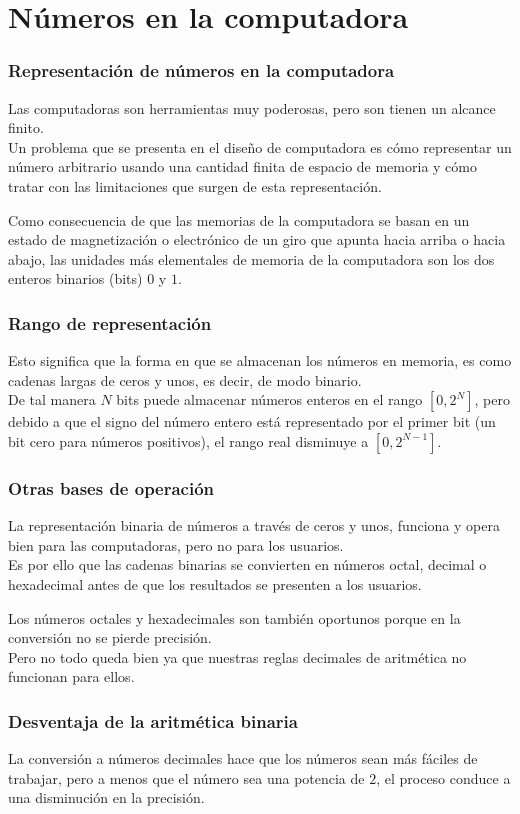 \section{Números en la computadora}
\begin{frame}
\frametitle{Representación de números en la computadora}
Las computadoras son herramientas muy poderosas, pero son tienen un alcance finito.
\\
\bigskip
Un problema que se presenta en el diseño de computadora es cómo representar un número arbitrario usando una cantidad finita de espacio de memoria y cómo tratar con las limitaciones que surgen de esta representación.
\end{frame}
\begin{frame}
Como consecuencia de que las memorias de la computadora se basan en un estado de magnetización o electrónico de un giro que apunta hacia arriba o hacia abajo, las unidades más elementales de memoria de la computadora son los dos enteros binarios (bits) $0$ y $1$.
\end{frame}
\begin{frame}
\frametitle{Rango de representación}
Esto significa que la forma en que se almacenan los números en memoria, es como cadenas largas de ceros y unos, es decir, de modo binario.
\\
\bigskip
De tal manera $N$ bits puede almacenar números enteros en el rango $[0, 2^{N}]$, pero debido a que el signo del número entero está representado por el primer bit (un bit cero para números positivos), el rango real disminuye a $[0, 2^{N- 1}]$.
\end{frame}
\begin{frame}
\frametitle{Otras bases de operación}
La representación binaria de números a través de ceros y unos, funciona y opera bien para las computadoras, pero no para los usuarios.
\\
\bigskip
Es por ello que las cadenas binarias se convierten en números octal, decimal o hexadecimal antes de que los resultados se presenten a los usuarios.
\end{frame}
\begin{frame}
Los números octales y hexadecimales son también oportunos porque en la conversión no se pierde precisión.
\\
\bigskip
Pero no todo queda bien ya que nuestras reglas decimales de aritmética no funcionan para ellos.
\end{frame}
\begin{frame}
\frametitle{Desventaja de la aritmética binaria}
La conversión a números decimales hace que los números sean más fáciles de trabajar, pero a menos que el número sea una potencia de $2$, el proceso conduce a una disminución en la precisión.
\end{frame}
